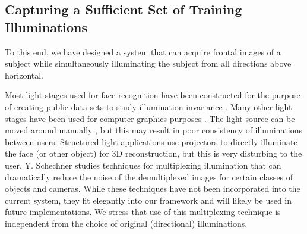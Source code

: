 \documentclass[12pt,journal,draftcls,letterpaper,onecolumn]{IEEEtran}
\begin{document}
\subsection{Capturing a Sufficient Set of Training Illuminations} To this end,
we have designed a system that can acquire frontal images of a subject while
simultaneously illuminating the subject from all directions above horizontal.

Most light stages used for face recognition have
been constructed for the purpose of creating public data sets to study
illumination invariance \cite{Georghiades2001-PAMI, Gross2008-FGR}.  Many other
light stages have been used for computer graphics purposes
\cite{debevec2000acquiring, jones2005performance}.
The light source can be
moved around manually \cite{masselus2002free}, but this may result in poor
consistency of illuminations between users.  Structured light applications use projectors to
directly illuminate the face (or other object) \cite{zhang2002rapid} for 3D
reconstruction, but this is very disturbing to the user. 
Y. Schechner \cite{schechner2007multiplexing}
studies techniques for multiplexing illumination that can dramatically reduce the noise 
of the demultiplexed images for certain classes of objects and cameras.  
While these techniques have not been incorporated into the current
system, they fit elegantly into our framework and will likely be used
in future implementations.  We stress that use of this multiplexing technique
is independent from the choice of original (directional) illuminations.
\end{document}
